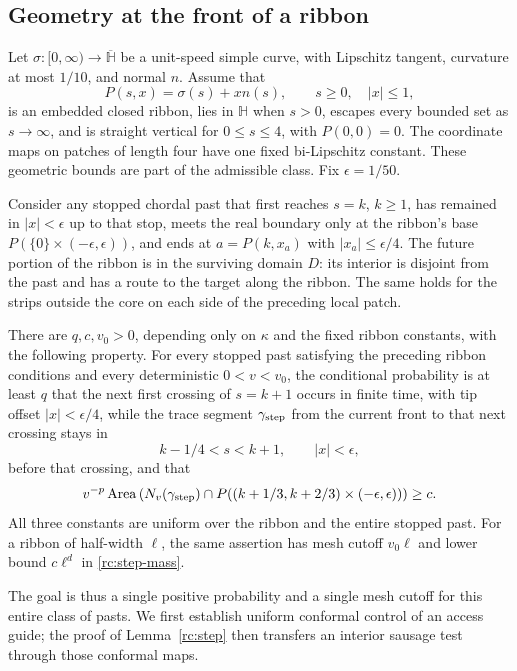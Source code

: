 \subsection{Geometry at the front of a ribbon}

Let $\sigma:[0,\infty)\to\overline{\mathbb H}$ be a unit-speed simple
curve, with Lipschitz tangent, curvature at most $1/10$, and normal $n$.
Assume that
\[
 P(s,x)=\sigma(s)+xn(s),\qquad s\ge0,\quad |x|\le1,
\]
is an embedded closed ribbon, lies in $\mathbb H$ when $s>0$, escapes
every bounded set as $s\to\infty$, and is straight vertical for
$0\le s\le4$, with $P(0,0)=0$.  The coordinate maps on patches of
length four have one fixed bi-Lipschitz constant. These geometric
bounds are part of the admissible class.  Fix $\epsilon=1/50$.

Consider any stopped chordal past that first reaches $s=k$, $k\ge1$,
has remained in $|x|<\epsilon$ up to that stop, meets the real boundary
only at the ribbon's base $P(\{0\}\times(-\epsilon,\epsilon))$, and ends at
$a=P(k,x_a)$ with $|x_a|\le\epsilon/4$.  The future portion of the
ribbon is in the surviving domain $D$: its interior is disjoint from the
past and has a route to the target along the ribbon.  The same holds for
the strips outside the core on each side of the preceding local patch.

\begin{lemma}\label{rc:step}
There are $q,c,v_0>0$, depending only on $\kappa$ and the fixed ribbon
constants, with the following property. For every stopped past
satisfying the preceding ribbon conditions and every deterministic
$0<v<v_0$, the conditional
probability is at least $q$ that the next first crossing of $s=k+1$
occurs in finite time, with tip offset $|x|<\epsilon/4$, while the
trace segment $\gamma_{\rm step}$ from the current
front to that next crossing stays in
\[
 k-1/4<s<k+1,\qquad |x|<\epsilon,
\]
before that crossing, and that
\begin{equation}\label{rc:step-mass}
 v^{-p}\operatorname{Area}
 \left(N_v(\gamma_{\rm step})\cap
   P((k+1/3,k+2/3)\times(-\epsilon,\epsilon))\right)\ge c.
\end{equation}
All three constants are uniform over the ribbon and the entire stopped
past.  For a ribbon of half-width $\ell$, the same assertion has mesh cutoff
$v_0\ell$ and lower bound $c\ell^d$ in \eqref{rc:step-mass}.
\end{lemma}

The goal is thus a single positive probability and a single mesh cutoff
for this entire class of pasts. We first establish uniform conformal
control of an access guide; the proof of Lemma~\ref{rc:step} then
transfers an interior sausage test through those conformal maps.

